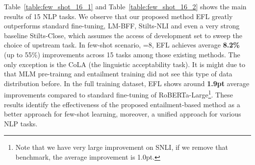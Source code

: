 \documentclass{article}
\begin{document}
\begin{table*}[t]
\centering
\renewcommand{\arraystretch}{1.1}
\caption{Our main few-shot learning results using RoBERTa-large on NLI, paraphrase, similarity and QA tasks. All the results are evaluated on full dev sets and averaged across 5 different training sets.}
\label{table:few_shot_16_2}
\end{table*}

Table~\ref{table:few_shot_16_1} and Table~\ref{table:few_shot_16_2} shows the main results of 15 NLP tasks. We observe that our proposed method EFL greatly outperforms standard fine-tuning, LM-BFF, Stilts-NLI and even a very strong baseline Stilts-Close, which assumes the access of development set to sweep the choice of upstream task. In few-shot scenario, =8, EFL achieves average \textbf{8.2\%} (up to 55\%) improvements across 15 tasks among those existing methods. The only exception is the CoLA (the linguistic acceptability task). It is might due to that MLM pre-trainng and entailment training did not see this type of data distribution before. In the full training dataset, EFL shows around \textbf{1.9pt} average improvements compared to standard fine-tuning of RoBERTa-Large\footnote{Note that we have very large improvement on SNLI, if we remove that benchmark, the average improvement is 1.0pt.}. These results identify the effectiveness of the proposed entailment-based method as a better approach for few-shot learning, moreover, a unified approach for various NLP tasks. 
\end{document}
